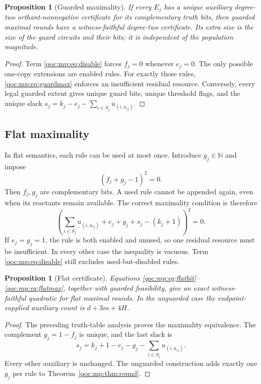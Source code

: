 \documentclass[11pt,letterpaper]{article}
\newtheorem{proposition}[theorem]{Proposition}
\theoremstyle{definition}
\theoremstyle{remark}
\newcommand{\N}{\mathbb N}
\begin{document}
\begin{proposition}[Guarded maximality]\label{qoc:mp:prop:guards}
If every $E_j$ has a unique auxiliary degree-two orthant-nonnegative
certificate for its complementary truth bits, then guarded maximal rounds
have a witness-faithful degree-two certificate. Its extra size is the
size of the guard circuits and their bits; it is independent of the
population magnitude.
\end{proposition}
\begin{proof}
Term \eqref{qoc:mp:eq:disable} forces $f_j=0$ whenever $e_j=0$. The only possible
one-copy extensions are enabled rules. For exactly those rules,
\eqref{qoc:mp:eq:guardmax} enforces an insufficient residual resource. Conversely,
every legal guarded extent gives unique guard bits, unique threshold
flags, and the unique slack
$s_j=k_j-e_j-\sum_{i\in S_j}u_{(i,a_{ij})}$.
\end{proof}

\subsection{Flat maximality}
In flat semantics, each rule can be used at most once. Introduce $g_j\in\N$
and impose
\begin{equation}\label{qoc:mp:eq:flatbit}
 (f_j+g_j-1)^2=0.
\end{equation}
Then $f_j,g_j$ are complementary bits. A used rule cannot be appended
again, even when its reactants remain available. The correct maximality
condition is therefore
\begin{equation}\label{qoc:mp:eq:flatmax}
 \left(\sum_{i\in S_j}u_{(i,a_{ij})}+e_j+g_j+s_j-(k_j+1)\right)^2=0.
\end{equation}
If $e_j=g_j=1$, the rule is both enabled and unused, so one residual
resource must be insufficient. In every other case the inequality is
vacuous. Term \eqref{qoc:mp:eq:disable} still excludes used-but-disabled rules.

\begin{proposition}[Flat certificate]\label{qoc:mp:prop:flat}
Equations \eqref{qoc:mp:eq:flatbit}--\eqref{qoc:mp:eq:flatmax}, together with guarded
feasibility, give an exact witness-faithful quadratic for flat maximal
rounds. In the unguarded case the endpoint-supplied auxiliary count is
$d+3m+4H$.
\end{proposition}
\begin{proof}
The preceding truth-table analysis proves the maximality equivalence.
The complement $g_j=1-f_j$ is unique, and the last slack is
\[
 s_j=k_j+1-e_j-g_j-\sum_{i\in S_j}u_{(i,a_{ij})}.
\]
Every other auxiliary is unchanged. The unguarded construction adds exactly
one $g_j$ per rule to Theorem~\ref{qoc:mp:thm:round}.
\end{proof}
\end{document}
